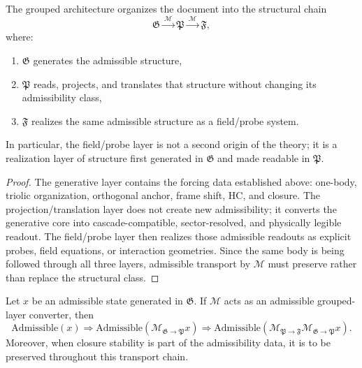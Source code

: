 \begin{proposition}
\label{prop:grouped-forcing-readout-chain}
The grouped architecture organizes the document into the structural chain
\[
\mathfrak G \xrightarrow{\ \mathcal M\ } \mathfrak P
\xrightarrow{\ \mathcal M\ } \mathfrak F,
\]
where:
\begin{enumerate}[leftmargin=2em,label=(\alph*)]
\item $\mathfrak G$ generates the admissible structure,
\item $\mathfrak P$ reads, projects, and translates that structure without changing
its admissibility class,
\item $\mathfrak F$ realizes the same admissible structure as a field/probe system.
\end{enumerate}
In particular, the field/probe layer is not a second origin of the theory; it
is a realization layer of structure first generated in $\mathfrak G$ and made
readable in $\mathfrak P$.
\end{proposition}

\begin{proof}
The generative layer contains the forcing data established above: one-body,
triolic organization, orthogonal anchor, frame shift, HC, and closure. The
projection/translation layer does not create new admissibility; it converts the
generative core into cascade-compatible, sector-resolved, and physically
legible readout. The field/probe layer then realizes those admissible readouts
as explicit probes, field equations, or interaction geometries. Since the same
body is being followed through all three layers, admissible transport by
$\mathcal M$ must preserve rather than replace the structural class.
\end{proof}

\begin{proposition}
\label{prop:admissibility-preservation-grouped-layers}
Let $x$ be an admissible state generated in $\mathfrak G$. If $\mathcal M$ acts as
an admissible grouped-layer converter, then
\[
\mathrm{Admissible}(x)
\Longrightarrow
\mathrm{Admissible}(\mathcal M_{\mathfrak G\to\mathfrak P}x)
\Longrightarrow
\mathrm{Admissible}(\mathcal M_{\mathfrak P\to\mathfrak F}\mathcal M_{\mathfrak G\to\mathfrak P}x).
\]
Moreover, when closure stability is part of the admissibility data, it is to be
preserved throughout this transport chain.
\end{proposition}

